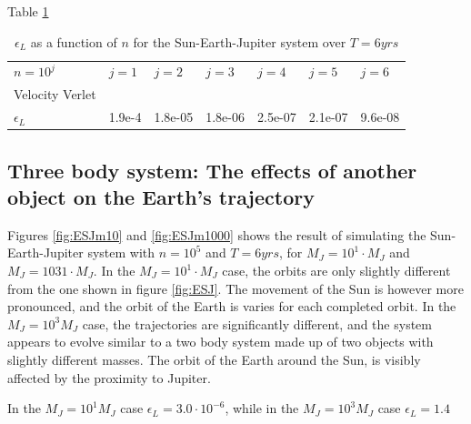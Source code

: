 \documentclass[%
oneside,                 %
final,                   %
10pt]{article}
\begin{document}
Table \ref{tab:ESJtable}
\begin{table}[]
\begin{tabular}{lllllll}
$n=10^j$                                & $j=1$                  & $j=2$                  & $j=3$                  & $j=4$                  & $j=5$                 & $j=6$                 \\
Velocity Verlet                      &                        &                        &                        &                        &                       &                       \\
$\epsilon_L$ & 1.9e-4 & 1.8e-05 & 1.8e-06 & 2.5e-07 & 2.1e-07 & 9.6e-08 \\
\end{tabular}
\caption{$\epsilon_L$ as a function of $n$ for the Sun-Earth-Jupiter system over $T=6yrs$}
\label{tab:ESJtable}
\end{table}


\subsection{Three body system: The effects of another object on the Earth's trajectory}
Figures \ref{fig:ESJm10} and \ref{fig:ESJm1000} shows the result of simulating the Sun-Earth-Jupiter system with $n=10^5$ and $T=6 yrs$, for $M_J=10^1 \cdot M_J$ and $M_J=1031 \cdot M_J$. In the $M_J=10^1 \cdot M_J$ case, the orbits are only slightly different from the one shown in figure \ref{fig:ESJ}. The movement of the Sun is however more pronounced, and the orbit of the Earth is varies for each completed orbit. In the $M_J=10^3 M_J$ case, the trajectories are significantly different, and the system appears  to evolve similar to a two body system made up of two objects with slightly different masses. The orbit of the Earth around the Sun, is visibly affected by the proximity to Jupiter. \newline

In the $M_J=10^1 M_J$ case $\epsilon_L= 3.0 \cdot 10^{-6}$, while in the $M_J=10^3 M_J$ case $\epsilon_L=1.4$
\end{document}
